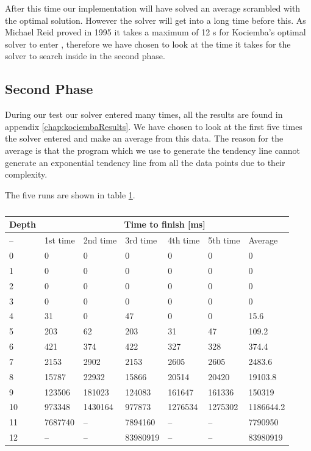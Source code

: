 After this time our implementation will have solved an average scrambled \rubik{} with the optimal solution.
However the solver will get into  a long time before this.
As Michael Reid proved in 1995 \cite{knowledgerush2} it takes a maximum of 12 \twist{}s for Kociemba's optimal solver to enter , therefore we have chosen to look at the time it takes for the solver to search inside  in the second phase.

\subsection{Second Phase}
During our test our solver entered  many times, all the results are found in appendix \ref{chap:kociembaResults}.
We have chosen to look at the first five times the solver entered  and make an average from this data.
The reason for the average is that the program which we use to generate the tendency line cannot generate an exponential tendency line from all the data points due to their complexity.

The five runs are shown in table \ref{tab:timeData2}.
\begin{table}[htb]
\centering
	\begin{tabular}{|l|l|l|l|l|l|l|}
	\hline
	Depth& \multicolumn{6}{|c|}{Time to finish [ms]}\\
	\hline
	--&1st time&2nd time&3rd time&4th time&5th time&Average\\
	\hline
	0&0&0&0&0&0&0\\
	\hline
	1&0&0&0&0&0&0\\
	\hline
	2&0&0&0&0&0&0\\
	\hline
	3&0&0&0&0&0&0\\
	\hline
	4&31&0&47&0&0&15.6\\
	\hline
	5&203&62&203&31&47&109.2\\
	\hline
	6&421&374&422&327&328&374.4\\
	\hline
	7&2153&2902&2153&2605&2605&2483.6\\
	\hline
	8&15787&22932&15866&20514&20420&19103.8\\
	\hline
	9&123506&181023&124083&161647&161336&150319\\
	\hline
	10&973348&1430164&977873&1276534&1275302&1186644.2\\
	\hline
	11&7687740&--&7894160&--&--&7790950\\
	\hline
	12&--&--&83980919&--&--&83980919\\
	\hline
	\end{tabular}
\caption{}
	\label{tab:timeData2}
\end{table}

